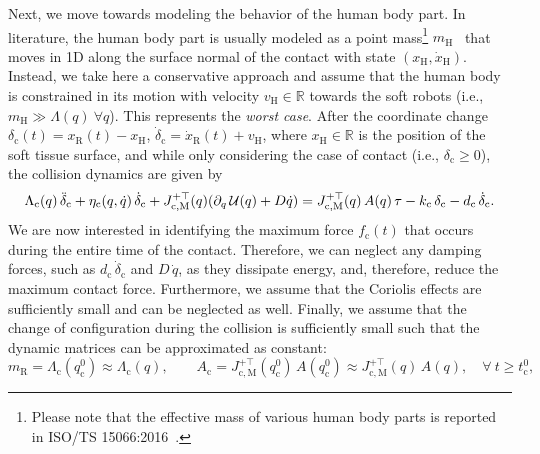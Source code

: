 Next, we move towards modeling the behavior of the human body part. In literature, the human body part is usually modeled as a point mass\footnote{Please note that the effective mass of various human body parts is reported in ISO/TS 15066:2016~\citep{iso2016collaborative}.} $m_\mathrm{H}$~\citep{haddadin2011safe, iso2016collaborative} that moves in 1D along the surface normal of the contact with state $(x_\mathrm{H},\dot{x}_\mathrm{H})$. Instead, we take here a conservative approach and assume that the human body is constrained in its motion with velocity $v_\mathrm{H} \in \mathbb{R}$ towards the soft robots (i.e., $m_\mathrm{H} \gg \Lambda(q) \: \forall q$). This represents the \emph{worst case}.
After the coordinate change $\delta_\mathrm{c}(t) = x_\mathrm{R}(t) - x_\mathrm{H}$, $\dot{\delta}_\mathrm{c} = \dot{x}_\mathrm{R}(t) + v_\mathrm{H}$, %
where $x_\mathrm{H} \in \mathbb{R}$ is the position of the soft tissue surface, and while only considering the case of contact (i.e., $\delta_\mathrm{c} \geq 0$), the collision dynamics are given by
\begin{equation}
    \Lambda_\mathrm{c}(q) \, \Ddot{\delta}_\mathrm{c} + \eta_\mathrm{c}(q,\dot{q}) \, \dot{\delta}_\mathrm{c} + J_\mathrm{c,M}^{+\top}(q) ( \partial_{q} \, \mathcal{U}(q) + D \dot{q} ) = J_\mathrm{c,M}^{+\top}(q) \, A(q) \, \tau - k_\mathrm{c} \, \delta_\mathrm{c} - d_\mathrm{c} \, \dot{\delta}_\mathrm{c}.
\end{equation}
We are now interested in identifying the maximum force $f_\mathrm{c}(t)$ that occurs during the entire time of the contact.
Therefore, we can neglect any damping forces, such as $d_\mathrm{c} \, \dot{\delta}_\mathrm{c}$ and $D \, \dot{q}$, as they dissipate energy, and, therefore, reduce the maximum contact force.
Furthermore, we assume that the Coriolis effects are sufficiently small and can be neglected as well.
Finally, we assume that the change of configuration during the collision is sufficiently small such that the dynamic matrices can be approximated as constant: 
\begin{equation}\label{eq:safetymetric:constant_reflected_inertia_and_actuation_matrix_definition}
    m_\mathrm{R} = \Lambda_\mathrm{c}(q_{\mathrm{c}}^0) \approx \Lambda_\mathrm{c}(q),
    \qquad
    A_\mathrm{c} = J_\mathrm{c,M}^{+\top}(q_{\mathrm{c}}^0) \, A(q_{\mathrm{c}}^0) \approx J_\mathrm{c,M}^{+\top}(q) \, A(q),
    \quad
    \forall \: t \geq t_\mathrm{c}^0,
\end{equation}
